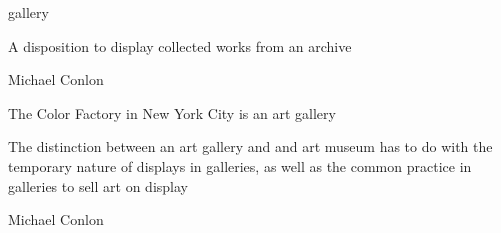 \documentclass[letterpaper,10pt,english]{sphinxmanual}
\begin{document}
\begin{sphinxShadowBox}

\sphinxAtStartPar
gallery
\end{sphinxShadowBox}

\begin{sphinxShadowBox}

\sphinxAtStartPar
{\hyperref[\detokenize{doc-BFO_0000016::doc}]{}}
\end{sphinxShadowBox}

\begin{sphinxShadowBox}

\sphinxAtStartPar
A disposition to display collected works from an archive
\end{sphinxShadowBox}

\begin{sphinxShadowBox}

\sphinxAtStartPar
Michael Conlon 
\end{sphinxShadowBox}

\begin{sphinxShadowBox}

\sphinxAtStartPar
The Color Factory in New York City is an art gallery
\end{sphinxShadowBox}

\begin{sphinxShadowBox}

\sphinxAtStartPar
The distinction between an art gallery and and art museum has to do with the temporary nature of displays in galleries, as well as the common practice in galleries to sell art on display
\end{sphinxShadowBox}

\begin{sphinxShadowBox}

\sphinxAtStartPar
Michael Conlon 
\end{sphinxShadowBox}
\begin{quote}

\ignorespaces \end{quote}
\end{document}
